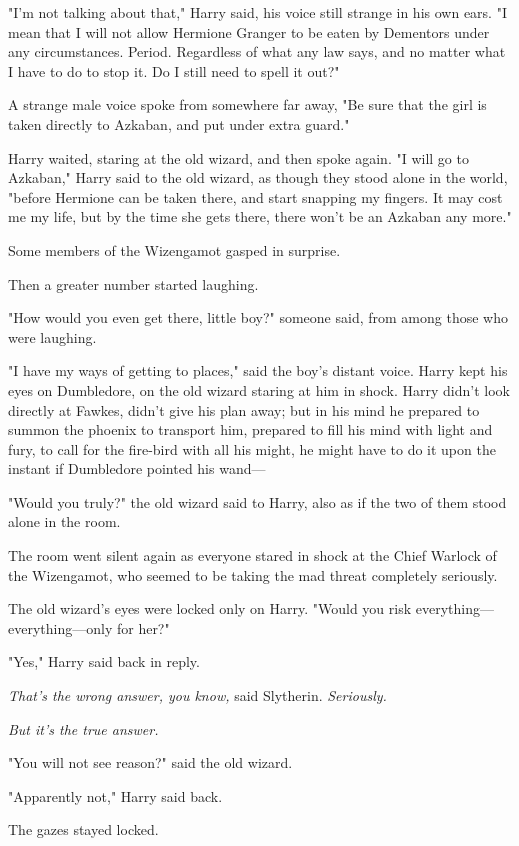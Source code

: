 "I'm not talking about that," Harry said, his voice still strange in his own
ears. "I mean that I will not allow Hermione Granger to be eaten by Dementors
under any circumstances. Period. Regardless of what any law says, and no matter
what I have to do to stop it. Do I still need to spell it out?"

A strange male voice spoke from somewhere far away, "Be sure that the girl is
taken directly to Azkaban, and put under extra guard."

Harry waited, staring at the old wizard, and then spoke again. "I will go to
Azkaban," Harry said to the old wizard, as though they stood alone in the
world, "before Hermione can be taken there, and start snapping my fingers. It
may cost me my life, but by the time she gets there, there won't be an Azkaban
any more."

Some members of the Wizengamot gasped in surprise.

Then a greater number started laughing.

"How would you even get there, little boy?" someone said, from among those who
were laughing.

"I have my ways of getting to places," said the boy's distant voice. Harry kept his
eyes on Dumbledore, on the old wizard staring at him in shock. Harry didn't
look directly at Fawkes, didn't give his plan away; but in his mind he prepared
to summon the phoenix to transport him, prepared to fill his mind with light
and fury, to call for the fire-bird with all his might, he might have to do it
upon the instant if Dumbledore pointed his wand—

"Would you truly?" the old wizard said to Harry, also as if the two of them
stood alone in the room.

The room went silent again as everyone stared in shock at the Chief Warlock of
the Wizengamot, who seemed to be taking the mad threat completely seriously.

The old wizard's eyes were locked only on Harry. "Would you risk
everything—everything—only for her?"

"Yes," Harry said back in reply.

\emph{That's the wrong answer, you know,} said Slytherin. \emph{Seriously.}

\emph{But it's the true answer.}

"You will not see reason?" said the old wizard.

"Apparently not," Harry said back.

The gazes stayed locked.

